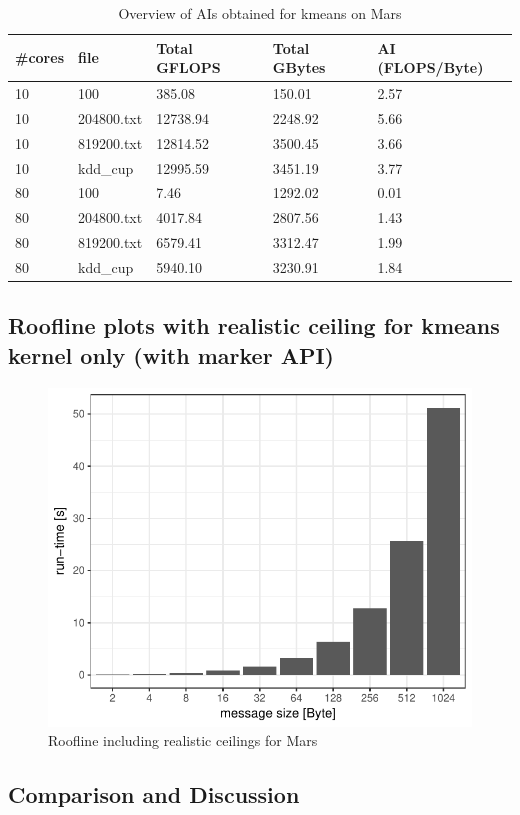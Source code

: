 \begin{table}[h]
\centering
\caption{\label{tab:ai_tab}Overview of AIs obtained for kmeans on Mars}
\begin{small}
\begin{tabular}{lllll}
\toprule
\#cores & file & Total GFLOPS & Total GBytes & AI (FLOPS/Byte) \\
\midrule
10 & 100 & 385.08 & 150.01 & 2.57 \\
10 & 204800.txt & 12738.94 & 2248.92 & 5.66 \\
10 & 819200.txt & 12814.52 & 3500.45 & 3.66 \\
10 & kdd\_cup & 12995.59 & 3451.19 & 3.77 \\
80 & 100 & 7.46 & 1292.02 & 0.01 \\
80 & 204800.txt & 4017.84 & 2807.56 & 1.43 \\
80 & 819200.txt & 6579.41 & 3312.47 & 1.99 \\
80 & kdd\_cup & 5940.10 & 3230.91 & 1.84 \\

\bottomrule
\end{tabular}
\end{small}
\end{table}

\subsection{Roofline plots with realistic ceiling for kmeans kernel only (with marker API)}

\begin{figure}[ht]
	\centering
	\includegraphics[width=.5\linewidth]{figures/runtime}
	\caption{Roofline including realistic ceilings for Mars}
	\label{fig:runtimex}
\end{figure}


\subsection{Comparison and Discussion}


